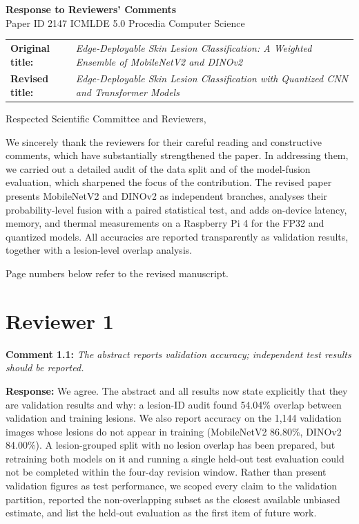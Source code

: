 \documentclass[11pt,a4paper]{article}
\begin{document}
\begin{center}
{\Large\bfseries Response to Reviewers' Comments}\\[4pt]
Paper ID 2147 \quad\textbullet\quad ICMLDE 5.0 \quad\textbullet\quad Procedia Computer Science
\end{center}

\begin{tabular}{@{}lp{}@{}}
\textbf{Original title:} & \emph{Edge-Deployable Skin Lesion Classification: A Weighted Ensemble of MobileNetV2 and DINOv2}\\
\textbf{Revised title:} & \emph{Edge-Deployable Skin Lesion Classification with Quantized CNN and Transformer Models}
\end{tabular}

\medskip
Respected Scientific Committee and Reviewers,

We sincerely thank the reviewers for their careful reading and constructive comments, which have substantially strengthened the paper. In addressing them, we carried out a detailed audit of the data split and of the model-fusion evaluation, which sharpened the focus of the contribution. The revised paper presents MobileNetV2 and DINOv2 as independent branches, analyses their probability-level fusion with a paired statistical test, and adds on-device latency, memory, and thermal measurements on a Raspberry Pi 4 for the FP32 and quantized models. All accuracies are reported transparently as validation results, together with a lesion-level overlap analysis.

Page numbers below refer to the revised manuscript.

\section*{Reviewer 1}
\textbf{Comment 1.1:} \emph{The abstract reports validation accuracy; independent test results should be reported.}

\textbf{Response:} We agree. The abstract and all results now state explicitly that they are validation results and why: a lesion-ID audit found 54.04\% overlap between validation and training lesions. We also report accuracy on the 1,144 validation images whose lesions do not appear in training (MobileNetV2 86.80\%, DINOv2 84.00\%). A lesion-grouped split with no lesion overlap has been prepared, but retraining both models on it and running a single held-out test evaluation could not be completed within the four-day revision window. Rather than present validation figures as test performance, we scoped every claim to the validation partition, reported the non-overlapping subset as the closest available unbiased estimate, and list the held-out evaluation as the first item of future work.
\end{document}
